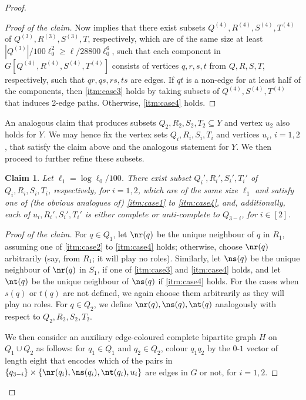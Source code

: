 \documentclass[11pt,english]{article}
\theoremstyle{plain}
\newtheorem{claim}[thm]{Claim}
\theoremstyle{definition}
\theoremstyle{remark}
\begin{document}
\begin{proof}
\begin{proof}[Proof of the claim]
            Now  implies that there exist subsets $Q^{(4)}, R^{(4)}, S^{(4)}, T^{(4)}$ of $Q^{(3)}, R^{(3)}, S^{(3)}, T$, respectively, which are of the same size at least $|Q^{(3)}| / 100\ell_0^2 \ge \ell / 28800\ell_0^6$, such that each component in $G[Q^{(4)}, R^{(4)}, S^{(4)}, T^{(4)}]$ consists of vertices $q, r, s, t$ from $Q, R, S, T$, respectively, such that $qr, qs, rs, ts$ are edges. If $qt$ is a non-edge for at least half of the components, then \ref{itm:case3} holds by taking subsets of $Q^{(4)}, S^{(4)}, T^{(4)}$ that induces 2-edge paths. Otherwise, \ref{itm:case4} holds.
        \end{proof}
        
        An analogous claim that produces subsets $Q_2, R_2, S_2, T_2\subseteq Y$ and vertex $u_2$ also holds for $Y$. We may hence fix the vertex sets $Q_i, R_i, S_i, T_i$ and vertices $u_i$, $i=1,2$, that satisfy the claim above and the analogous statement for $Y$. We then proceed to further refine these subsets.
        
        \begin{claim}
            Let $\ell_1 = \log \ell_0 / 100$. There exist subset $Q_i', R_i', S_i', T_i'$ of $Q_i, R_i, S_i, T_i$, respectively, for $i =1,2$, which are of the same size $\ell_1$ and satisfy one of (the obvious analogues of) \ref{itm:case1} to \ref{itm:case4}, and, additionally, each of $u_i, R_i', S_i', T_i'$ is either complete or anti-complete to $Q_{3-i}$, for $i \in [2]$.
        \end{claim}
        
        \begin{proof}[Proof of the claim]
            For $q \in Q_1$, let $\nr(q)$ be the unique neighbour of $q$ in $R_1$, assuming one of \ref{itm:case2} to \ref{itm:case4} holds; otherwise, choose $\nr(q)$ arbitrarily (say, from $R_1$; it will play no roles). Similarly, let $\ns(q)$ be the unique neighbour of $\nr(q)$ in $S_1$, if one of \ref{itm:case3} and \ref{itm:case4} holds, and let $\nt(q)$ be the unique neighbour of $\ns(q)$ if \ref{itm:case4} holds.
            For the cases when $s(q)$ or $t(q)$ are not defined, we again choose them arbitrarily as they will play no roles.
            For $q \in Q_2$, we define $\nr(q), \ns(q), \nt(q)$ analogously with respect to $Q_2, R_2, S_2, T_2$.
            
            We then consider an auxiliary edge-coloured complete bipartite graph $H$ on $Q_1\cup Q_2$ as follows: for $q_1 \in Q_1$ and $q_2 \in Q_2$, colour $q_1 q_2$ by the $0$-$1$ vector of length eight that encodes which of the pairs in $\{q_{3-i}\} \times \{\nr(q_i), \ns(q_i), \nt(q_i), u_i\}$ are edges in $G$ or not, for $i=1,2$.
            

\end{proof}
\end{proof}
\end{document}

